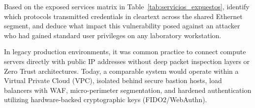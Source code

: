\begin{retoforense}
Based on the exposed services matrix in Table~\ref{tab:servicios_expuestos}, identify which protocols transmitted credentials in cleartext across the shared Ethernet segment, and deduce what impact this vulnerability posed against an attacker who had gained standard user privileges on any laboratory workstation.
\end{retoforense}

\begin{perspectiva20}
In legacy production environments, it was common practice to connect compute servers directly with public IP addresses without deep packet inspection layers or Zero Trust architectures. Today, a comparable system would operate within a Virtual Private Cloud (VPC), isolated behind secure bastion hosts, load balancers with WAF, micro-perimeter segmentation, and hardened authentication utilizing hardware-backed cryptographic keys (FIDO2/WebAuthn).
\end{perspectiva20}

